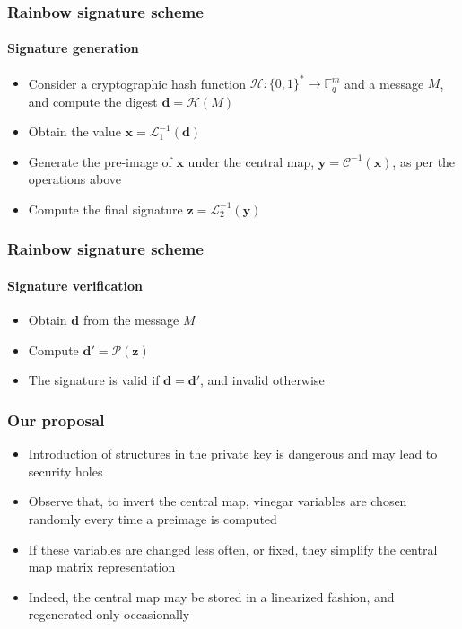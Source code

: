 \documentclass[12pt]{beamer}
\begin{document}
\begin{frame}
\begin{itemize}
\begin{figure}
    \end{figure}
  \end{itemize}
\end{frame}

\begin{frame}
  \frametitle{Rainbow signature scheme}
  \framesubtitle{Signature generation}
  \begin{itemize}
    \item Consider a cryptographic hash function
        $\mathcal{H} : \{0, 1\}^{*} \to \mathbb{F}_{q}^{m}$ and a message $M$,
          and compute the digest $\mathbf{d} = \mathcal{H}(M)$
    \item Obtain the value $\mathbf{x} = \mathcal{L}_{1}^{-1}(\mathbf{d})$
    \item Generate the pre-image of $\mathbf{x}$ under the central map,
        $\mathbf{y} = \mathcal{C}^{-1}(\mathbf{x})$, as per the operations
          above
    \item Compute the final signature
        $\mathbf{z} = \mathcal{L}_{2}^{-1}(\mathbf{y})$
  \end{itemize}
\end{frame}

\begin{frame}
  \frametitle{Rainbow signature scheme}
  \framesubtitle{Signature verification}
  \begin{itemize}
    \item Obtain $\mathbf{d}$ from the message $M$
    \item Compute $\mathbf{d}' = \mathcal{P}(\mathbf{z})$
    \item The signature is valid if $\mathbf{d} = \mathbf{d}'$, and invalid
        otherwise
  \end{itemize}
\end{frame}

\begin{frame}
  \frametitle{Our proposal}
  \begin{itemize}
    \item Introduction of structures in the private key is dangerous and may
        lead to security holes
    \item Observe that, to invert the central map, vinegar variables are
        chosen randomly every time a preimage is computed
    \item If these variables are changed less often, or fixed, they simplify
        the central map matrix representation
    \item Indeed, the central map may be stored in a linearized fashion, and
        regenerated only occasionally
  \end{itemize}
\end{frame}
\end{document}
